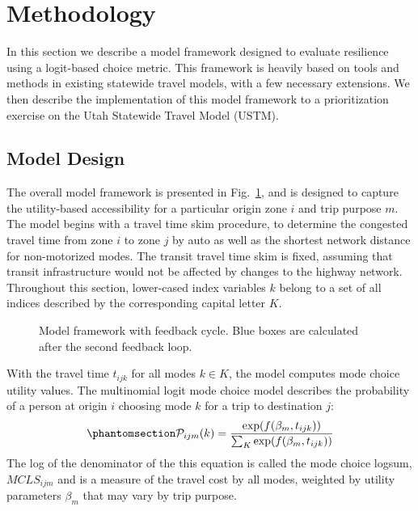 \documentclass[]{ascelike-new}
\begin{document}

\section{Methodology}\label{methodology}

In this section we describe a model framework designed to evaluate
resilience using a logit-based choice metric. This framework is heavily
based on tools and methods in existing statewide travel models, with a
few necessary extensions. We then describe the implementation of this
model framework to a prioritization exercise on the Utah Statewide
Travel Model (USTM).

\subsection{Model Design}\label{model-design}

The overall model framework is presented in Fig.~\ref{fig-framework},
and is designed to capture the utility-based accessibility for a
particular origin zone \(i\) and trip purpose \(m\). The model begins
with a travel time skim procedure, to determine the congested travel
time from zone \(i\) to zone \(j\) by auto as well as the shortest
network distance for non-motorized modes. The transit travel time skim
is fixed, assuming that transit infrastructure would not be affected by
changes to the highway network. Throughout this section, lower-cased
index variables \(k\) belong to a set of all indices described by the
corresponding capital letter \(K\).

\begin{figure}


\caption{\label{fig-framework}Model framework with feedback cycle. Blue
boxes are calculated after the second feedback loop.}

\end{figure}%

With the travel time \(t_{ijk}\) for all modes \(k \in K\), the model
computes mode choice utility values. The multinomial logit mode choice
model describes the probability of a person at origin \(i\) choosing
mode \(k\) for a trip to destination \(j\):
\begin{equation}\phantomsection\label{eq-mcp}{
\mathcal{P}_{ijm}(k) = \frac{\exp(f(\beta_{m}, t_{ijk}))}{\sum_{K}\exp(f(\beta_{m}, t_{ijk}))}
}\end{equation} The log of the denominator of the this equation is
called the mode choice logsum, \(MCLS_{ijm}\) and is a measure of the
travel cost by all modes, weighted by utility parameters \(\beta_m\)
that may vary by trip purpose.
\end{document}
